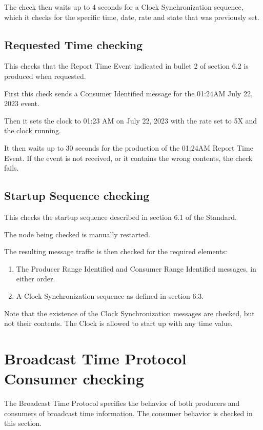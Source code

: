 The check then waits up to 4 seconds for a Clock Synchronization sequence, which it checks for
the specific time, date, rate and state that was previously set.

\subsection{Requested Time checking}

This checks that the Report Time Event indicated in bullet 2 of section 6.2 is 
produced when requested.

First this check sends a Consumer Identified message for the 01:24AM  July 22, 2023 event.

Then it sets the clock to 01:23 AM on July 22, 2023 with the rate set to 5X and the clock running.

It then waits up to 30 seconds for the production of the 01;24AM Report Time Event.
If the event is not received, or it contains the wrong contents, the check fails.

\subsection{Startup Sequence checking}

This checks the startup sequence described in section 6.1 of the Standard.

The node being checked is manually restarted.

The resulting message traffic is then checked for the required elements:
\begin{enumerate}
\item The Producer Range Identified and Consumer Range Identified messages, in either order.
\item A Clock Synchronization sequence as defined in section 6.3.
\end{enumerate}

Note that the existence of the Clock Synchronization messages are checked, but not 
their contents.  The Clock is allowed to start up with any time value.

\section{Broadcast Time Protocol Consumer checking}

The Broadcast Time Protocol specifies the behavior of both producers and consumers of 
broadcast time information.  
The consumer behavior is checked in this section.

